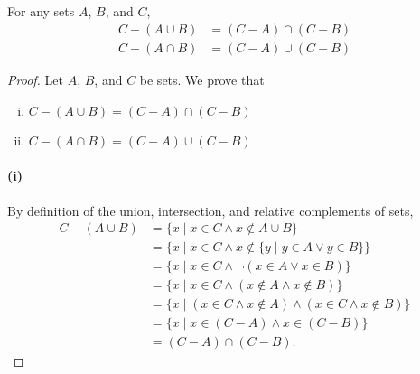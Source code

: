 \documentclass{report}
\begin{document}
\subsection{}%

For any sets $A$, $B$, and $C$,
  \begin{align*}
    C - (A \cup B) & = (C - A) \cap (C - B) \\
    C - (A \cap B) & = (C - A) \cup (C - B)
  \end{align*}

\begin{proof}

  \statementpadding



  \noindent Let $A$, $B$, and $C$ be sets.
  We prove that
    \begin{enumerate}[(i)]
      \item $C - (A \cup B) = (C - A) \cap (C - B)$
      \item $C - (A \cap B) = (C - A) \cup (C - B)$
    \end{enumerate}

  \paragraph{(i)}%

    By definition of the union, intersection, and relative complements of sets,
      \begin{align*}
        C - (A \cup B)
          & = \{ x \mid x \in C \land x \not\in A \cup B \} \\
          & = \{ x \mid x \in C \land
                        x \not\in \{ y \mid y \in A \lor y \in B \}\} \\
          & = \{ x \mid x \in C \land \neg(x \in A \lor x \in B) \} \\
          & = \{ x \mid x \in C \land (x \not\in A \land x \not\in B) \} \\
          & = \{ x \mid (x \in C \land x \not\in A) \land
                        (x \in C \land x \not\in B) \} \\
          & = \{ x \mid x \in (C - A) \land x \in (C - B) \} \\
          & = (C - A) \cap (C - B).
      \end{align*}


\end{proof}
\end{document}
